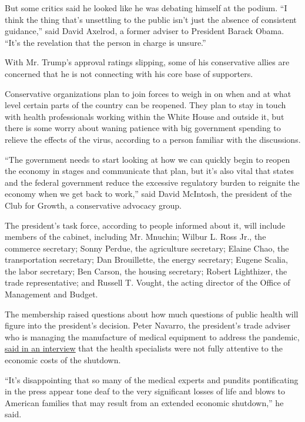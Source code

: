 But some critics said he looked like he was debating himself at the
podium. ``I think the thing that's unsettling to the public isn't just
the absence of consistent guidance,'' said David Axelrod, a former
adviser to President Barack Obama. ``It's the revelation that the person
in charge is unsure.''

With Mr. Trump's approval ratings slipping, some of his conservative
allies are concerned that he is not connecting with his core base of
supporters.

Conservative organizations plan to join forces to weigh in on when and
at what level certain parts of the country can be reopened. They plan to
stay in touch with health professionals working within the White House
and outside it, but there is some worry about waning patience with big
government spending to relieve the effects of the virus, according to a
person familiar with the discussions.

``The government needs to start looking at how we can quickly begin to
reopen the economy in stages and communicate that plan, but it's also
vital that states and the federal government reduce the excessive
regulatory burden to reignite the economy when we get back to work,''
said David McIntosh, the president of the Club for Growth, a
conservative advocacy group.

The president's task force, according to people informed about it, will
include members of the cabinet, including Mr. Mnuchin; Wilbur L. Ross
Jr., the commerce secretary; Sonny Perdue, the agriculture secretary;
Elaine Chao, the transportation secretary; Dan Brouillette, the energy
secretary; Eugene Scalia, the labor secretary; Ben Carson, the housing
secretary; Robert Lighthizer, the trade representative; and Russell T.
Vought, the acting director of the Office of Management and Budget.

The membership raised questions about how much questions of public
health will figure into the president's decision. Peter Navarro, the
president's trade adviser who is managing the manufacture of medical
equipment to address the pandemic,
\href{https://www.nytimes3xbfgragh.onion/2020/04/13/us/politics/peter-navarro-coronavirus.html}{said
in an interview} that the health specialists were not fully attentive to
the economic costs of the shutdown.

``It's disappointing that so many of the medical experts and pundits
pontificating in the press appear tone deaf to the very significant
losses of life and blows to American families that may result from an
extended economic shutdown,'' he said.

